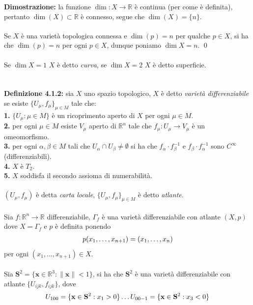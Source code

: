 \documentclass{article}
\begin{document}
\textbf{Dimostrazione:} la funzione $\dim : X \longrightarrow \mathbb{R}$ è continua (per come è definita), pertanto $\dim (X) \subset \mathbb{R}$ è connesso, segue che $\dim(X) = \{ n \}$. \\ \\
Se $X$ è una varietà topologica connessa e $\dim (p) = n$ per qualche $p \in X$, si ha che $\dim (p) = n$ per ogni $p \in X$, dunque poniamo $\dim X = n$. \qed \\ \\
Se $\dim X = 1$ $X$ è detto \textit{curva}, se $\dim X = 2$ $X$ è detto superficie. \\ \\ \\
\textbf{Definizione 4.1.2:} sia $X$ uno spazio topologico, $X$ è detto \textit{varietà differenziabile} se esiste $\{ U_\mu, f_\mu \}_{\mu \in M}$ tale che: \\
\textbf{1.} $\{ U_\mu : \mu \in M \}$ è un ricoprimento aperto di $X$ per ogni $\mu \in M$. \\
\textbf{2.} per ogni $\mu \in M$ esiste $V_\mu$ aperto di $\mathbb{R}^n$ tale che $f_\mu : U_\mu \longrightarrow V_\mu$ è un omeomorfismo. \\
\textbf{3.} per ogni $\alpha, \beta \in M$ tali che $U_\alpha \cap U_\beta \neq \emptyset$ si ha che $f_\alpha \cdot f^{-1}_\beta$ e $f_\beta \cdot f^{-1}_\alpha$ sono $C^{\infty}$ (differenziabili). \\
\textbf{4.} $X$ è $T_2$. \\
\textbf{5.} $X$ soddisfa il secondo assioma di numerabilità. \\ \\
$(U_\mu, f_\mu)$ è detta \textit{carta locale}, $\{ U_\mu, f_\mu \}_{\mu \in M}$ è detto \textit{atlante}. \\ \\
Sia $f : \mathbb{R}^n \longrightarrow \mathbb{R}$ differenziabile, $\Gamma_f$ è una varietà differenziabile con atlante $(X, p)$ dove $X = \Gamma_f$ e $p$ è definita ponendo
\begin{gather}
    p(x_1, \dots, x_{n + 1}) = (x_1, \dots, x_n) \notag
\end{gather} 
per ogni $(x_1, \dots, x_{n + 1}) \in X$. \\ \\
Sia $\mathbf{S}^2 = \{ \mathbf{x} \in \mathbb{R}^3 : \| \mathbf{x} \| < 1 \}$, si ha che $\mathbf{S}^2$ è una varietà differenziabile con atlante $\{ U_{ijk}, f_{ijk} \}$, dove
\begin{gather}
    U_{100} = \{ \mathbf{x} \in \mathbf{S}^2 : x_1 > 0 \} \dots U_{00-1} = \{ \mathbf{x} \in \mathbf{S}^2 : x_3 < 0 \} \notag
\end{gather}
\end{document}
